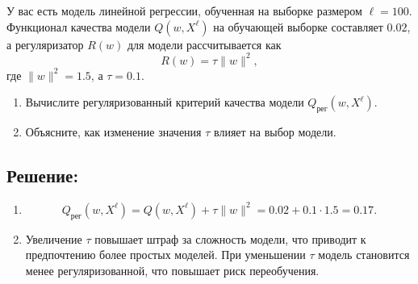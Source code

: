 У вас есть модель линейной регрессии, обученная на выборке размером $\ell = 100$. Функционал качества модели $Q(w, X^\ell)$ на обучающей выборке составляет $0.02$, а регуляризатор $R(w)$ для модели рассчитывается как 
\[
R(w) = \tau \|w\|^2,
\]
где $\|w\|^2 = 1.5$, а $\tau = 0.1$. 

\begin{enumerate}
    \item Вычислите регуляризованный критерий качества модели $Q_{\text{рег}}(w, X^\ell)$.
    \item Объясните, как изменение значения $\tau$ влияет на выбор модели.
\end{enumerate}

\subsection*{Решение:}

\begin{enumerate}
    \item
    \[
    Q_{\text{рег}}(w, X^\ell) = Q(w, X^\ell) + \tau \|w\|^2 = 0.02 + 0.1 \cdot 1.5 = 0.17.
    \]
    \item Увеличение $\tau$ повышает штраф за сложность модели, что приводит к предпочтению более простых моделей. При уменьшении $\tau$ модель становится менее регуляризованной, что повышает риск переобучения.
\end{enumerate}
